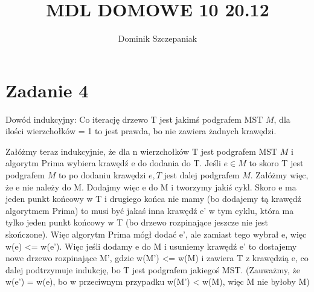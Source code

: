 \documentclass[12pt]{article}
\title{MDL DOMOWE 10 20.12}
\author{Dominik Szczepaniak}
\begin{document}
\maketitle

\bgroup\obeylines
\section{Zadanie 4}%

Dowód indukcyjny:
Co iterację drzewo T jest jakimś podgrafem MST $M$, dla ilości wierzchołków = 1 to jest prawda, bo nie zawiera żadnych krawędzi.

Załóżmy teraz indukcyjnie, że dla n wierzchołków T jest podgrafem MST $M$ i algorytm Prima wybiera krawędź e do dodania do T. Jeśli $e \in M$ to skoro T jest podgrafem $M$ to po dodaniu krawędzi $e, T$ jest dalej podgrafem $M$. 
Załóżmy więc, że e nie należy do M. Dodajmy więc e do M i tworzymy jakiś cykl. Skoro e ma jeden punkt końcowy w T i drugiego końca nie mamy (bo dodajemy tą krawędź algorytmem Prima) to musi być jakaś inna krawędź e' w tym cyklu, która ma tylko jeden punkt końcowy w T (bo drzewo rozpinające jeszcze nie jest skończone). Więc algorytm Prima mógł dodać e', ale zamiast tego wybrał e, więc w(e) <= w(e'). Więc jeśli dodamy e do M i usuniemy krawędź e' to dostajemy nowe drzewo rozpinające M', gdzie w(M') <= w(M) i zawiera T z krawędzią e, co dalej podtrzymuje indukcję, bo T jest podgrafem jakiegoś MST.
(Zauważmy, że w(e') = w(e), bo w przeciwnym przypadku w(M') < w(M), więc M nie byłoby M)


\egroup
\end{document}
